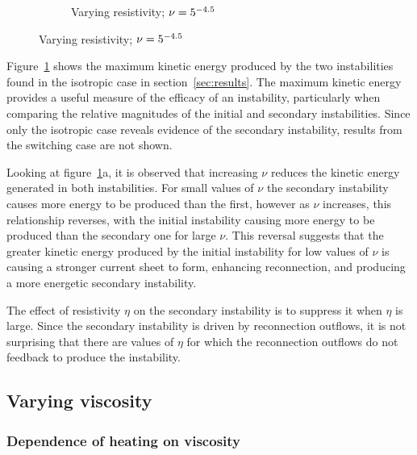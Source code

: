 \begin{figure}[t]
\begin{subfigure}[t]{0.5\textwidth}
      \caption{Varying resistivity; $\nu = 5\time 10^{-4.5}$}
    \end{subfigure}
    \label{fig:secondary_instability}
\end{figure}

Figure~\ref{fig:secondary_instability} shows the maximum kinetic energy produced by the two instabilities found in the isotropic case in section~\ref{sec:results}. The maximum kinetic energy provides a useful measure of the efficacy of an instability, particularly when comparing the relative magnitudes of the initial and secondary instabilities. Since only the isotropic case reveals evidence of the secondary instability, results from the switching case are not shown.

Looking at figure~\ref{fig:secondary_instability}a, it is observed that increasing $\nu$ reduces the kinetic energy generated in both instabilities. For small values of $\nu$ the secondary instability causes more energy to be produced than the first, however as $\nu$ increases, this relationship reverses, with the initial instability causing more energy to be produced than the secondary one for large $\nu$. This reversal suggests that the greater kinetic energy produced by the initial instability for low values of $\nu$ is causing a stronger current sheet to form, enhancing reconnection, and producing a more energetic secondary instability.

The effect of resistivity $\eta$ on the secondary instability is to suppress it when $\eta$ is large. Since the secondary instability is driven by reconnection outflows, it is not surprising that there are values of $\eta$ for which the reconnection outflows do not feedback to produce the instability.

\subsection{Varying viscosity}

\label{sec:visc_param_study}

\subsubsection{Dependence of heating on viscosity}


